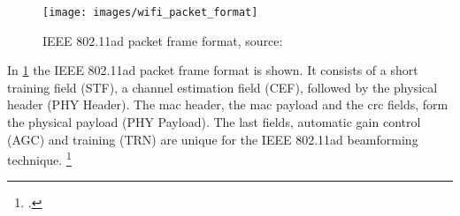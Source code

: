 \begin{figure}[ht]
  \centering
  \texttt{[image: images/wifi\_packet\_format]}
  \caption{IEEE 802.11ad packet frame format, source: \cite[4]{Nitsche2014}}
  \label{fig:wifi_packet_format}
\end{figure}

In \cref{fig:wifi_packet_format} the IEEE 802.11ad packet frame format is shown. It consists of a short training field (STF), a channel estimation field (CEF), followed by the physical header (PHY Header). The \gls{mac} header, the \gls{mac} payload and the \gls{crc} fields, form the physical payload (PHY Payload). The last fields, automatic gain control (AGC) and training (TRN) are unique for the IEEE 802.11ad beamforming technique. \footcite[Cf.][3]{Nitsche2014}
